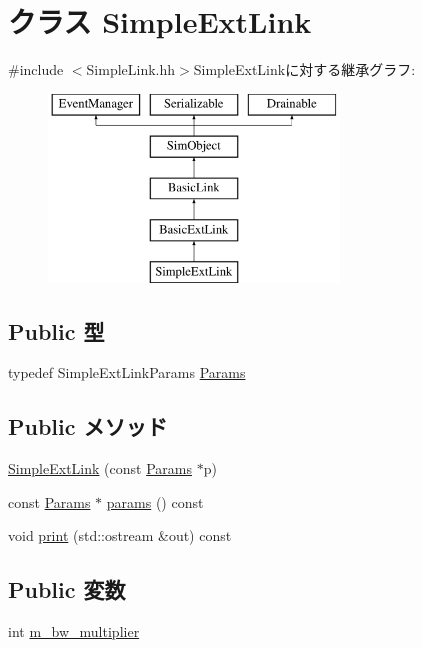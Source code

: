 \hypertarget{classSimpleExtLink}{
\section{クラス SimpleExtLink}
\label{classSimpleExtLink}
}


{\ttfamily \#include $<$SimpleLink.hh$>$}SimpleExtLinkに対する継承グラフ:\begin{figure}[H]
\begin{center}
\leavevmode
\includegraphics[height=5cm]{classSimpleExtLink}
\end{center}
\end{figure}
\subsection*{Public 型}
\begin{DoxyCompactItemize}
\item 
typedef SimpleExtLinkParams \hyperlink{classSimpleExtLink_a0653c80078cb239e9c7e87cfaead7ec9}{Params}
\end{DoxyCompactItemize}
\subsection*{Public メソッド}
\begin{DoxyCompactItemize}
\item 
\hyperlink{classSimpleExtLink_ac89df5142e0bd6a7e66b018b2587f562}{SimpleExtLink} (const \hyperlink{classSimpleExtLink_a0653c80078cb239e9c7e87cfaead7ec9}{Params} $\ast$p)
\item 
const \hyperlink{classSimpleExtLink_a0653c80078cb239e9c7e87cfaead7ec9}{Params} $\ast$ \hyperlink{classSimpleExtLink_acd3c3feb78ae7a8f88fe0f110a718dff}{params} () const 
\item 
void \hyperlink{classSimpleExtLink_ac55fe386a101fbae38c716067c9966a0}{print} (std::ostream \&out) const 
\end{DoxyCompactItemize}
\subsection*{Public 変数}
\begin{DoxyCompactItemize}
\item 
int \hyperlink{classSimpleExtLink_a543e68bab5d8c6ed00c96039e2ef62fd}{m\_\-bw\_\-multiplier}
\end{DoxyCompactItemize}
